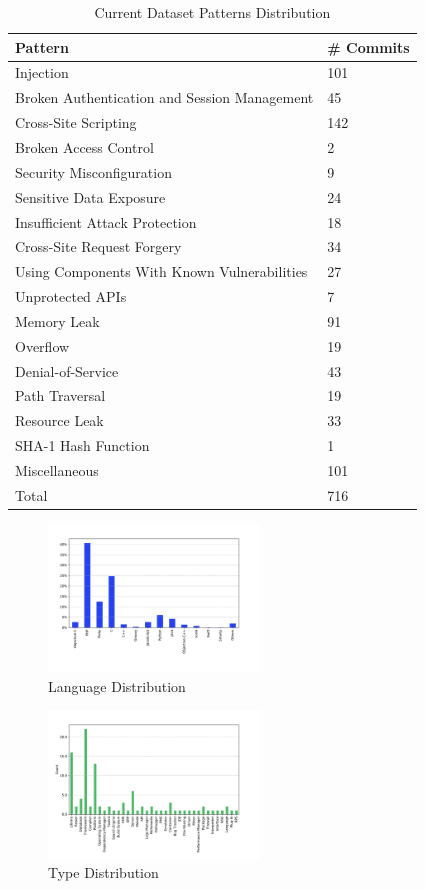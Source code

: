 \documentclass[10pt,conference]{IEEEtran}
\begin{document}
\begin{table}[h]
	\centering
\caption{Current Dataset Patterns Distribution} \label{tab:patterns}
\begin{tabular}{@{}ll@{}}
\toprule
Pattern & \# Commits\\
\midrule
Injection & 101\\
Broken Authentication and Session Management& 45\\
Cross-Site Scripting& 142\\
Broken Access Control& 2\\
Security Misconfiguration& 9\\
Sensitive Data Exposure& 24\\
Insufficient Attack Protection& 18\\
Cross-Site Request Forgery& 34\\
Using Components With Known Vulnerabilities& 27\\
Unprotected APIs& 7\\
Memory Leak& 91\\
Overflow& 19\\
Denial-of-Service& 43\\
Path Traversal& 19\\
Resource Leak& 33\\
SHA-1 Hash Function & 1\\
Miscellaneous& 101\\\midrule
Total& 716\\
\bottomrule
\end{tabular}
\end{table}

\begin{figure}[h]
 	\centering
 	\includegraphics[width=0.5\textwidth]{figures/language_dist.pdf}
 	\caption{Language Distribution}
	\label{fig:lang}
\end{figure}

\begin{figure}[h]
 	\centering
 	\includegraphics[width=0.5\textwidth]{figures/type_dist.pdf}
 	\caption{Type Distribution}
	\label{fig:type}
\end{figure}
\end{document}
